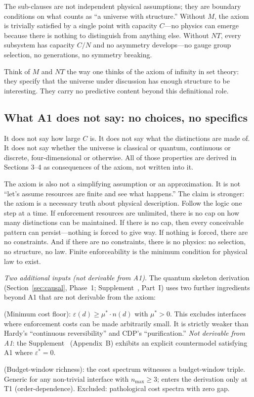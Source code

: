 \documentclass[11pt]{article}
\begin{document}
The sub-clauses are not independent physical assumptions; they are boundary conditions on what counts as ``a universe with structure.''  Without $M$, the axiom is trivially satisfied by a single point with capacity $C$---no physics can emerge because there is nothing to distinguish from anything else.  Without $NT$, every subsystem has capacity $C/N$ and no asymmetry develops---no gauge group selection, no generations, no symmetry breaking.

Think of $M$ and $NT$ the way one thinks of the axiom of infinity in set theory: they specify that the universe under discussion has enough structure to be interesting.  They carry no predictive content beyond this definitional role.


\subsection{What A1 does not say: no choices, no specifics}

It does not say how large $C$ is.  It does not say what the distinctions are made of.  It does not say whether the universe is classical or quantum, continuous or discrete, four-dimensional or otherwise.  All of those properties are derived in Sections 3--4 as consequences of the axiom, not written into it.

The axiom is also not a simplifying assumption or an approximation.  It is not ``let's assume resources are finite and see what happens.''  The claim is stronger: the axiom is a necessary truth about physical description.  Follow the logic one step at a time.  If enforcement resources are unlimited, there is no cap on how many distinctions can be maintained.  If there is no cap, then every conceivable pattern can persist---nothing is forced to give way.  If nothing is forced, there are no constraints.  And if there are no constraints, there is no physics: no selection, no structure, no law.  Finite enforceability is the minimum condition for physical law to exist.

\medskip
\noindent\textit{Two additional inputs (not derivable from A1).}  The quantum skeleton derivation (Section~\ref{sec:causal}, Phase~1; Supplement~\cite{Supp}, Part~I) uses two further ingredients beyond A1 that are not derivable from the axiom:

\begin{description}[nosep,leftmargin=2em]
\item[\textbf{MD}] (Minimum cost floor): $\varepsilon(d) \ge \mu^* \cdot n(d)$ with $\mu^* > 0$.  This excludes interfaces where enforcement costs can be made arbitrarily small.  It is strictly weaker than Hardy's ``continuous reversibility'' and CDP's ``purification.''  \textit{Not derivable from A1}: the Supplement~\cite{Supp} (Appendix~B) exhibits an explicit countermodel satisfying A1 where $\varepsilon^* = 0$.
\item[\textbf{BW}] (Budget-window richness): the cost spectrum witnesses a budget-window triple.  Generic for any non-trivial interface with $n_{\max} \ge 3$; enters the derivation only at T1 (order-dependence).  Excluded: pathological cost spectra with zero gap.
\end{description}
\end{document}
